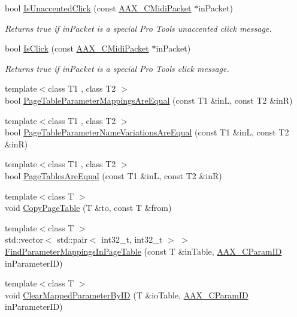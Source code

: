 \begin{DoxyCompactItemize}
bool \mbox{\hyperlink{a00852_a4f915a56cb150638f036cb7ed33facd8}{Is\+Unaccented\+Click}} (const \mbox{\hyperlink{a01429}{A\+A\+X\+\_\+\+C\+Midi\+Packet}} $\ast$in\+Packet)
\begin{DoxyCompactList}\small\item\em Returns true if {\ttfamily in\+Packet} is a special Pro Tools unaccented click message. \end{DoxyCompactList}\item 
bool \mbox{\hyperlink{a00852_a8f9544e49b4473862e0c1382f6963ce7}{Is\+Click}} (const \mbox{\hyperlink{a01429}{A\+A\+X\+\_\+\+C\+Midi\+Packet}} $\ast$in\+Packet)
\begin{DoxyCompactList}\small\item\em Returns true if {\ttfamily in\+Packet} is a special Pro Tools click message. \end{DoxyCompactList}\item 
{\footnotesize template$<$class T1 , class T2 $>$ }\\bool \mbox{\hyperlink{a00852_a6615318d686a57585ba69565f8e6a99b}{Page\+Table\+Parameter\+Mappings\+Are\+Equal}} (const T1 \&inL, const T2 \&inR)
\item 
{\footnotesize template$<$class T1 , class T2 $>$ }\\bool \mbox{\hyperlink{a00852_a2e75756c486e5db4ffa91579bb486a6a}{Page\+Table\+Parameter\+Name\+Variations\+Are\+Equal}} (const T1 \&inL, const T2 \&inR)
\item 
{\footnotesize template$<$class T1 , class T2 $>$ }\\bool \mbox{\hyperlink{a00852_a315085bafc0ddf4e7043a69d070da2fb}{Page\+Tables\+Are\+Equal}} (const T1 \&inL, const T2 \&inR)
\item 
{\footnotesize template$<$class T $>$ }\\void \mbox{\hyperlink{a00852_a99fe28eb20cfcef49e99710060c5ebe0}{Copy\+Page\+Table}} (T \&to, const T \&from)
\item 
{\footnotesize template$<$class T $>$ }\\std\+::vector$<$ std\+::pair$<$ int32\+\_\+t, int32\+\_\+t $>$ $>$ \mbox{\hyperlink{a00852_ac87bacdbc6323ab3f099c16ed8b508be}{Find\+Parameter\+Mappings\+In\+Page\+Table}} (const T \&in\+Table, \mbox{\hyperlink{a00392_a1440c756fe5cb158b78193b2fc1780d1}{A\+A\+X\+\_\+\+C\+Param\+ID}} in\+Parameter\+ID)
\item 
{\footnotesize template$<$class T $>$ }\\void \mbox{\hyperlink{a00852_ae583643c21c696c4d094a500b4e6d77e}{Clear\+Mapped\+Parameter\+By\+ID}} (T \&io\+Table, \mbox{\hyperlink{a00392_a1440c756fe5cb158b78193b2fc1780d1}{A\+A\+X\+\_\+\+C\+Param\+ID}} in\+Parameter\+ID)

\end{DoxyCompactItemize}
